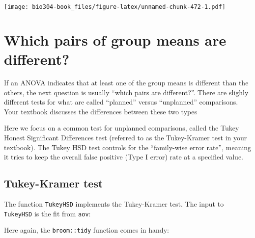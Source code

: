 \documentclass[]{book}
\newenvironment{Shaded}{\begin{snugshade}}{\end{snugshade}}
\newcommand{\CommentTok}[1]{\textcolor[rgb]{0.56,0.35,0.01}{\textit{#1}}}
\newcommand{\KeywordTok}[1]{\textcolor[rgb]{0.13,0.29,0.53}{\textbf{#1}}}
\newcommand{\NormalTok}[1]{#1}
\theoremstyle{definition}
\theoremstyle{definition}
\theoremstyle{definition}
\theoremstyle{remark}
\begin{document}
\texttt{[image: bio304-book\_files/figure-latex/unnamed-chunk-472-1.pdf]}

\hypertarget{which-pairs-of-group-means-are-different}{%
\section{Which pairs of group means are
different?}\label{which-pairs-of-group-means-are-different}}

If an ANOVA indicates that at least one of the group means is different
than the others, the next question is usually ``which pairs are
different?''. There are slighly different tests for what are called
``planned'' versus ``unplanned'' comparisons. Your textbook discusses
the differences between these two types

Here we focus on a common test for unplanned comparisons, called the
Tukey Honest Significant Differences test (referred to as the
Tukey-Kramer test in your textbook). The Tukey HSD test controls for the
``family-wise error rate'', meaning it tries to keep the overall false
positive (Type I error) rate at a specified value.

\hypertarget{tukey-kramer-test}{%
\subsection{Tukey-Kramer test}\label{tukey-kramer-test}}

The function \texttt{TukeyHSD} implements the Tukey-Kramer test. The
input to \texttt{TukeyHSD} is the fit from \texttt{aov}:

\begin{Shaded}
\end{Shaded}

Here again, the \texttt{broom::tidy} function comes in handy:
\end{document}
